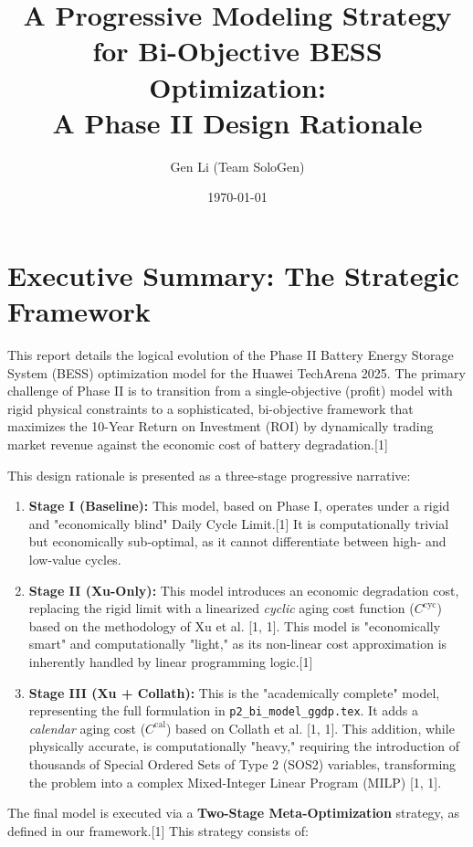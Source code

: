 \documentclass[11pt, a4paper]{article}
\title{A Progressive Modeling Strategy for Bi-Objective BESS Optimization: \\ \large A Phase II Design Rationale}
\author{Gen Li (Team SoloGen)}
\date{\today}
\begin{document}
\maketitle
\thispagestyle{fancy}

\section{Executive Summary: The Strategic Framework}

This report details the logical evolution of the Phase II Battery Energy Storage System (BESS) optimization model for the Huawei TechArena 2025. The primary challenge of Phase II is to transition from a single-objective (profit) model with rigid physical constraints to a sophisticated, bi-objective framework that maximizes the 10-Year Return on Investment (ROI) by dynamically trading market revenue against the economic cost of battery degradation.[1]

This design rationale is presented as a three-stage progressive narrative:

\begin{enumerate}
    \item \textbf{Stage I (Baseline):} This model, based on Phase I, operates under a rigid and "economically blind" Daily Cycle Limit.[1] It is computationally trivial but economically sub-optimal, as it cannot differentiate between high- and low-value cycles.
    \item \textbf{Stage II (Xu-Only):} This model introduces an economic degradation cost, replacing the rigid limit with a linearized \textit{cyclic} aging cost function ($C^{\mathrm{cyc}}$) based on the methodology of Xu et al. [1, 1]. This model is "economically smart" and computationally "light," as its non-linear cost approximation is inherently handled by linear programming logic.[1]
    \item \textbf{Stage III (Xu + Collath):} This is the "academically complete" model, representing the full formulation in \texttt{p2\_bi\_model\_ggdp.tex}. It adds a \textit{calendar} aging cost ($C^{\mathrm{cal}}$) based on Collath et al. [1, 1]. This addition, while physically accurate, is computationally "heavy," requiring the introduction of thousands of Special Ordered Sets of Type 2 (SOS2) variables, transforming the problem into a complex Mixed-Integer Linear Program (MILP) [1, 1].
\end{enumerate}

The final model is executed via a \textbf{Two-Stage Meta-Optimization} strategy, as defined in our framework.[1] This strategy consists of:
\end{document}
